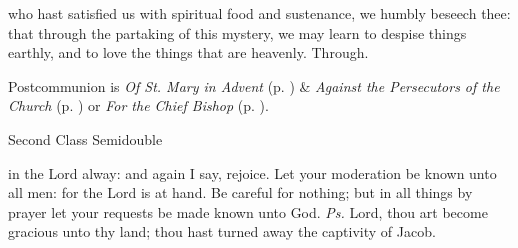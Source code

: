\postcommunion
{} who hast satisfied us with spiritual food and sustenance, we humbly beseech thee: that through the partaking of this mystery, we may learn to despise things earthly, and to love the things that are heavenly. Through.
\begin{rubric}
     Postcommunion is \emph{Of St. Mary in Advent} (p. \pageref{SPMaryInAdvent}) \&  \emph{Against the Persecutors of the Church} (p. \pageref{SPAgainst}) or \emph{For the Chief Bishop} (p. \pageref{SPChiefBishop}).
\end{rubric}


\begin{inhead}
{Second Class Semidouble}
\end{inhead}
\par\noindent
{}



\properantiphonfix

\introit
{} in the Lord alway: and again I say, rejoice. Let your moderation be known unto all men: for the Lord is at hand. Be careful for nothing; but in all things by prayer let your requests be made known unto God. \textit{Ps.} Lord, thou art become gracious unto thy land; thou hast turned away the captivity of Jacob.

\vspace{-1ex}

